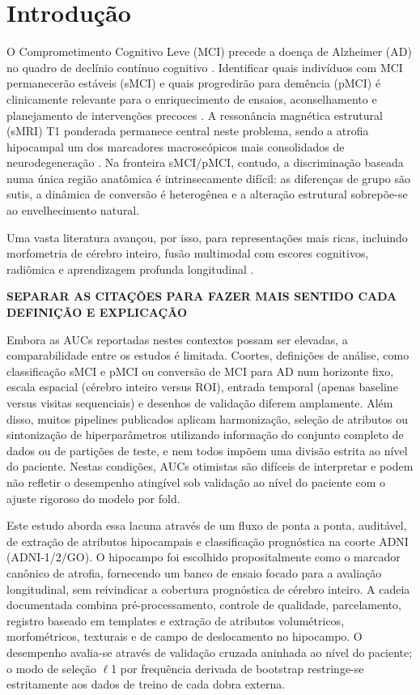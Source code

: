 \documentclass[review]{elsarticle}
\newcommand{\sugestao}[2]{%
	\textcolor{red}{\sout{\textbf{#1}}}%
	\textcolor{blue!100!black}{\textbf{#2}}%
}
\begin{document}
	
\section{Introdução}\label{sec:Introduction}

O Comprometimento Cognitivo Leve (MCI) precede a doença de Alzheimer (AD) no quadro de declínio contínuo cognitivo \cite{petersen-1999}. Identificar quais indivíduos com MCI permanecerão estáveis (sMCI) e quais progredirão para demência (pMCI) é clinicamente relevante para o enriquecimento de ensaios, aconselhamento e planejamento de intervenções precoces \cite{petersen-2009}. A ressonância magnética  estrutural (sMRI) T1 ponderada permanece central neste problema, sendo a atrofia hipocampal um dos marcadores macroscópicos mais consolidados de neurodegeneração \cite{scheltens-1992}. Na fronteira sMCI/pMCI, contudo, a discriminação baseada numa única região anatômica é intrinsecamente difícil: as diferenças de grupo são sutis, a dinâmica de conversão é heterogênea e a alteração estrutural sobrepõe-se ao envelhecimento natural.

Uma vasta literatura avançou, por isso, para representações mais ricas, incluindo morfometria de cérebro inteiro, fusão multimodal com escores cognitivos, radiômica e aprendizagem profunda longitudinal \cite{moradi-2015,ye-2012,zhang-2019,lin-2020,aghajanian-2025}. 

\sugestao{}{SEPARAR AS CITAÇÕES PARA FAZER MAIS SENTIDO CADA DEFINIÇÃO E EXPLICAÇÃO}

Embora as AUCs reportadas nestes contextos possam ser elevadas, a comparabilidade entre os estudos é limitada. Coortes, definições de análise, como classificação sMCI e pMCI ou conversão de MCI para AD num horizonte fixo, escala espacial (cérebro inteiro versus ROI), entrada temporal (apenas baseline versus visitas sequenciais) e desenhos de validação diferem amplamente. Além disso, muitos pipelines publicados aplicam harmonização, seleção de atributos ou sintonização de hiperparâmetros utilizando informação do conjunto completo de dados ou de partições de teste, e nem todos impõem uma divisão estrita ao nível do paciente. Nestas condições, AUCs otimistas são difíceis de interpretar e podem não refletir o desempenho atingível sob validação ao nível do paciente com o ajuste rigoroso do modelo por fold.

Este estudo aborda essa lacuna através de um fluxo de ponta a ponta, auditável, de extração de atributos hipocampais e classificação prognóstica na coorte ADNI (ADNI-1/2/GO). O hipocampo foi escolhido propositalmente como o marcador canônico de atrofia, fornecendo um banco de ensaio focado para a avaliação longitudinal, sem reivindicar a cobertura prognóstica de cérebro inteiro. A cadeia documentada combina pré-processamento, controle de qualidade, parcelamento, registro baseado em templates e extração de atributos volumétricos, morfométricos, texturais e de campo de deslocamento no hipocampo. O desempenho avalia-se através de validação cruzada aninhada ao nível do paciente; o modo de seleção $\ell$1 por frequência derivada de bootstrap restringe-se estritamente aos dados de treino de cada dobra externa.
\end{document}
